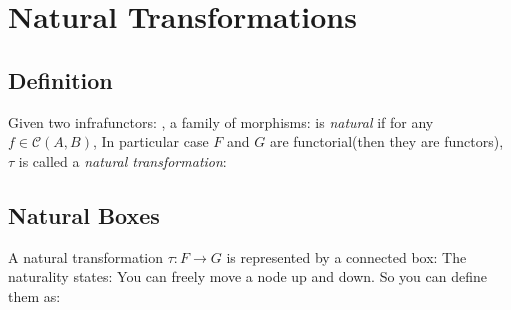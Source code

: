 \section{Natural Transformations}

\subsection{Definition}

Given two infrafunctors:
, a family of morphisms:
is \textit{natural} if for any $f \in \mathcal{C}(A,B)$,
In particular case $F$ and $G$ are functorial(then they are functors), $\tau$ is called a \textit{natural transformation}:

\subsection{Natural Boxes}

A natural transformation $\tau : F \to G$ is represented by a connected box:
The naturality states:
You can freely move a node up and down. So you can define them as:



